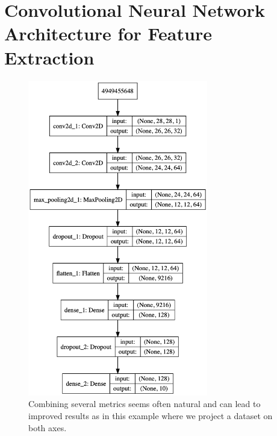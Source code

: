 \chapter{Convolutional Neural Network Architecture for Feature Extraction}
\label{sec:cnnarchitecture}

\begin{figure}[H]
    \centering
    \includegraphics[width=0.7\textwidth]{images/model}
    \caption{Combining several metrics seems often natural and can lead to improved results as in this example where we project a dataset on both axes.}
    \label{fig:model}
\end{figure}